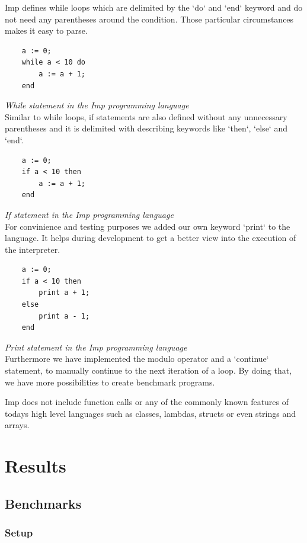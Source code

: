 \documentclass{article}
\begin{document}
Imp defines while loops which are delimited by the `do` and `end` keyword and
do not need any parentheses around the condition. Those particular circumstances
makes it easy to parse.

\begin{verbatim}
    a := 0;
    while a < 10 do
        a := a + 1;
    end
\end{verbatim}
\textit{While statement in the Imp programming language} \\

Similar to while loops, if statements are also defined without any unnecessary
parentheses and it is delimited with describing keywords like `then`, `else`
and `end`.

\begin{verbatim}
    a := 0;
    if a < 10 then
        a := a + 1;
    end
\end{verbatim}
\textit{If statement in the Imp programming language} \\

For convinience and testing purposes we added our own keyword `print` to the
language. It helps during development to get a better view into the execution
of the interpreter.

\begin{verbatim}
    a := 0;
    if a < 10 then
        print a + 1;
    else
        print a - 1;
    end
\end{verbatim}
\textit{Print statement in the Imp programming language} \\

Furthermore we have implemented the modulo operator and a `continue` statement,
to manually continue to the next iteration of a loop. By doing that, we have
more possibilities to create benchmark programs.

Imp does not include function calls or any of the commonly known features of
todays high level languages such as classes, lambdas, structs or even strings
and arrays.

\section{Results}

\subsection{Benchmarks}
\subsubsection{Setup}
\end{document}
